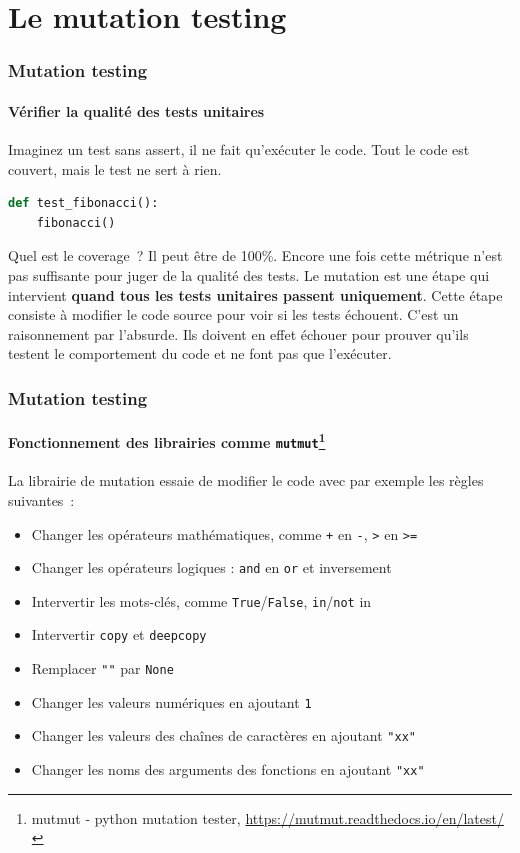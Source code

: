 \documentclass{beamer}
\begin{document}
    \section{Le mutation testing}\label{sec:mutation-testing}

    \begin{frame}[fragile]
        \frametitle{Mutation testing}
        \framesubtitle{Vérifier la qualité des tests unitaires}
        \transdissolve
        Imaginez un test sans assert, il ne fait qu'exécuter le code.
        Tout le code est couvert, mais le test ne sert à rien.
        \begin{lstlisting}[language=Python]
def test_fibonacci():
    fibonacci()
        \end{lstlisting}
        \bigbreak
        Quel est le coverage~?
        \pause
        Il peut être de 100\%.
        Encore une fois cette métrique n'est pas suffisante pour juger de la qualité des tests.
        \bigbreak
        Le mutation est une étape qui intervient \textbf{quand tous les tests unitaires passent uniquement}.
        Cette étape consiste à modifier le code source pour voir si les tests échouent.
        C'est un raisonnement par l'absurde.
        Ils doivent en effet échouer pour prouver qu'ils testent le comportement du code et ne font pas que l'exécuter.
    \end{frame}

    \begin{frame}
        \frametitle{Mutation testing}
        \framesubtitle{Fonctionnement des librairies comme \lstinline{mutmut}\footnote{mutmut - python mutation tester, \url{https://mutmut.readthedocs.io/en/latest/}}}
        \transdissolve
        La librairie de mutation essaie de modifier le code avec par exemple les règles suivantes~:
        \begin{itemize}
            \item Changer les opérateurs mathématiques, comme \lstinline{+} en \lstinline{-}, \lstinline{>} en \lstinline{>=}
            \item Changer les opérateurs logiques : \lstinline{and} en \lstinline{or} et inversement
            \item Intervertir les mots-clés, comme \lstinline{True}/\lstinline{False}, \lstinline{in}/\lstinline{not} in
            \item Intervertir \lstinline{copy} et \lstinline{deepcopy}
            \item Remplacer \lstinline{""} par \lstinline{None}
            \item Changer les valeurs numériques en ajoutant \lstinline{1}
            \item Changer les valeurs des chaînes de caractères en ajoutant \lstinline{"xx"}
            \item Changer les noms des arguments des fonctions en ajoutant \lstinline{"xx"}
        \end{itemize}
    \end{frame}
\end{document}
